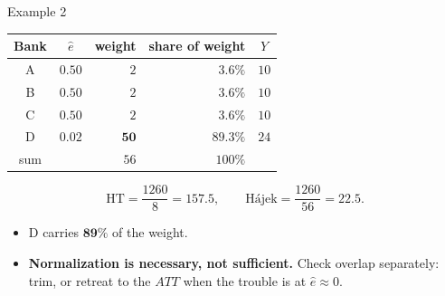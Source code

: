 \documentclass[
  11pt,
  ignorenonframetext,
  aspectratio=169,
]{beamer}
\providecommand{\tightlist}{%
  \setlength{\itemsep}{0pt}\setlength{\parskip}{0pt}}
\begin{document}
\begin{frame}{Example 2}
\protect{}\label{example-2}
\begin{center}
\footnotesize
\begin{tabular}{ccrrc}
\toprule
Bank & $\hat e$ & weight & share of weight & $Y$ \\
\midrule
A & $0.50$ & $2$  & $3.6\%$ & $10$ \\
B & $0.50$ & $2$  & $3.6\%$ & $10$ \\
C & $0.50$ & $2$  & $3.6\%$ & $10$ \\
D & $\mathbf{0.02}$ & $\mathbf{50}$ & $\mathbf{89.3\%}$ & $24$ \\
\midrule
sum & & $56$ & $100\%$ & \\
\bottomrule
\end{tabular}
\end{center}

\vspace{-0.3em}

\[
\text{HT} = \frac{1260}{8} = \mathbf{157.5},
\qquad
\text{Hájek} = \frac{1260}{56} = \mathbf{22.5} .
\]

\begin{itemize}
\tightlist
\item
  D carries \(\mathbf{89\%}\) of the weight.
\item
  \textbf{Normalization is necessary, not sufficient.} Check overlap
  separately: trim, or retreat to the \(ATT\) when the trouble is at
  \(\hat e \approx 0\).
\end{itemize}
\end{frame}
\end{document}
